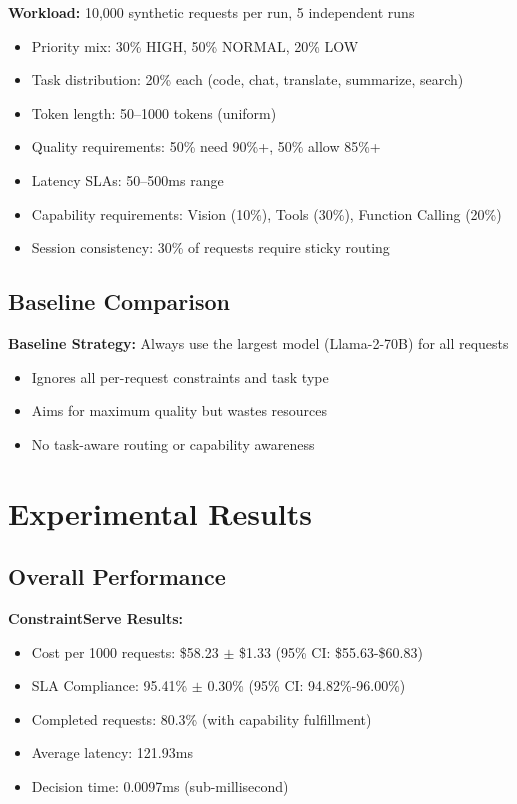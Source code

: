 \documentclass[11pt]{article}
\begin{document}
\textbf{Workload:} 10,000 synthetic requests per run, 5 independent runs
\begin{itemize}
    \item Priority mix: 30\% HIGH, 50\% NORMAL, 20\% LOW
    \item Task distribution: 20\% each (code, chat, translate, summarize, search)
    \item Token length: 50--1000 tokens (uniform)
    \item Quality requirements: 50\% need 90\%+, 50\% allow 85\%+
    \item Latency SLAs: 50--500ms range
    \item Capability requirements: Vision (10\%), Tools (30\%), Function Calling (20\%)
    \item Session consistency: 30\% of requests require sticky routing
\end{itemize}

\subsection{Baseline Comparison}

\textbf{Baseline Strategy:} Always use the largest model (Llama-2-70B) for all requests
\begin{itemize}
    \item Ignores all per-request constraints and task type
    \item Aims for maximum quality but wastes resources
    \item No task-aware routing or capability awareness
\end{itemize}

\section{Experimental Results}

\subsection{Overall Performance}

\textbf{ConstraintServe Results:}
\begin{itemize}
    \item Cost per 1000 requests: \$58.23 $\pm$ \$1.33 (95\% CI: \$55.63-\$60.83)
    \item SLA Compliance: 95.41\% $\pm$ 0.30\% (95\% CI: 94.82\%-96.00\%)
    \item Completed requests: 80.3\% (with capability fulfillment)
    \item Average latency: 121.93ms
    \item Decision time: 0.0097ms (sub-millisecond)
\end{itemize}
\end{document}

